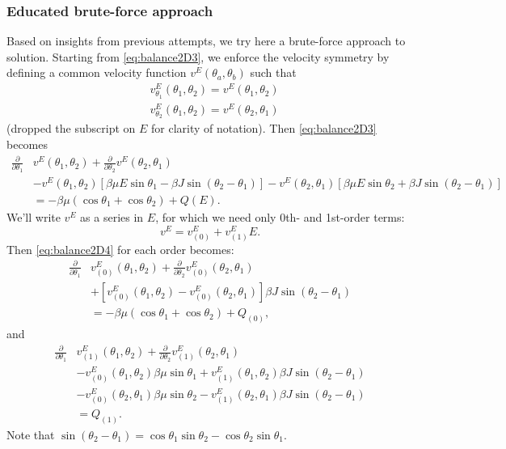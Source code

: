 \documentclass[11pt,reqno]{amsart}
\begin{document}
\subsubsection{Educated brute-force approach}
Based on insights from previous attempts, we try here a brute-force approach to solution.  Starting from \eqref{eq:balance2D3}, we enforce the velocity symmetry by defining a common velocity function $v^{E}(\theta_a,\theta_b)$ such that
\begin{subequations}
\begin{align}
&v^{E}_{\theta_1}(\theta_1,\theta_2) = v^{E}(\theta_1,\theta_2)\\
&v^{E}_{\theta_2}(\theta_1,\theta_2) = v^{E}(\theta_2,\theta_1)
\end{align}
\end{subequations}
(dropped the subscript on $E$ for clarity of notation).  Then \eqref{eq:balance2D3} becomes
\begin{align}
\label{eq:balance2D4}
\frac{\partial }{\partial \theta_1}&{ v}^{E}(\theta_1,\theta_2) + \frac{\partial }{\partial \theta_2}{ v}^{E}(\theta_2,\theta_1) \nonumber\\
&- { v}^{E}(\theta_1,\theta_2) [\beta\mu E \sin\theta_1 - \beta J \sin(\theta_2-\theta_1)]
- { v}^{E}(\theta_2,\theta_1) [\beta\mu E \sin\theta_2 + \beta J \sin(\theta_2-\theta_1)] \nonumber\\
&= -\beta\mu(\cos\theta_1+\cos\theta_2) + Q(E).
\end{align}
We'll write $v^E$ as a series in $E$, for which we need only 0th- and 1st-order terms: 
\begin{equation}
v^E = v^E_{(0)} + v^E_{(1)} E.
\end{equation} 
Then \eqref{eq:balance2D4} for each order becomes:
\begin{align}
\label{eq:balance2D40}
\frac{\partial }{\partial \theta_1}&{ v}^{E}_{(0)}(\theta_1,\theta_2) + \frac{\partial }{\partial \theta_2}{ v}^{E}_{(0)}(\theta_2,\theta_1) \nonumber\\
&+ [{ v}^{E}_{(0)}(\theta_1,\theta_2)-{ v}^{E}_{(0)}(\theta_2,\theta_1)] \beta J \sin(\theta_2-\theta_1) \nonumber\\
&= -\beta\mu(\cos\theta_1+\cos\theta_2) + Q_{(0)},
\end{align}
and
\begin{align}
\label{eq:balance2D41}
\frac{\partial }{\partial \theta_1}&{ v}^{E}_{(1)}(\theta_1,\theta_2) + \frac{\partial }{\partial \theta_2}{ v}^{E}_{(1)}(\theta_2,\theta_1) \nonumber\\
&- { v}^{E}_{(0)}(\theta_1,\theta_2) \beta\mu  \sin\theta_1 + { v}^{E}_{(1)}(\theta_1,\theta_2)\beta J \sin(\theta_2-\theta_1)\nonumber\\
&- { v}^{E}_{(0)}(\theta_2,\theta_1) \beta\mu \sin\theta_2 - { v}^{E}_{(1)}(\theta_2,\theta_1)\beta J \sin(\theta_2-\theta_1) \nonumber\\
&=  Q_{(1)}.
\end{align}
Note that $\sin(\theta_2-\theta_1) = \cos\theta_1\sin\theta_2 - \cos\theta_2\sin\theta_1$.
\end{document}
